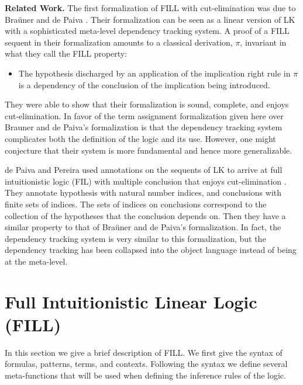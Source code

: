 \textbf{Related Work.} The first formalization of FILL with
cut-elimination was due to Bra\"uner and de Paiva \cite{Brauner:1998}.
Their formalization can be seen as a linear version of LK with a
sophisticated meta-level dependency tracking system.  A proof of a
FILL sequent in their formalization amounts to a classical derivation,
$\pi$, invariant in what they call the FILL property:
\begin{center}
  \begin{itemize}
  \item The hypothesis discharged by an application of the implication
    right rule in $\pi$ is a dependency of the conclusion of the
    implication being introduced.
  \end{itemize}
\end{center}
They were able to show that their formalization is sound, complete,
and enjoys cut-elimination.  In favor of the term assignment
formalization given here over Brauner and de Paiva's formalization is
that the dependency tracking system complicates both the definition of
the logic and its use.  However, one might conjecture that their
system is more fundamental and hence more generalizable.

de Paiva and Pereira used annotations on the sequents of LK to arrive
at full intuitionistic logic (FIL) with multiple conclusion that
enjoys cut-elimination \cite{dePaiva:2005}. They annotate hypothesis
with natural number indices, and conclusions with finite sets of
indices.  The sets of indices on conclusions correspond to the
collection of the hypotheses that the conclusion depends on.  Then
they have a similar property to that of Bra\"uner and de Paiva's
formalization.  In fact, the dependency tracking system is very
similar to this formalization, but the dependency tracking has been
collapsed into the object language instead of being at the meta-level.

\section{Full Intuitionistic Linear Logic (FILL)}
\label{sec:full_intuitionistic_linear_logic_(fill)}

In this section we give a brief description of FILL.  We first give
the syntax of formulas, patterns, terms, and contexts.  Following the
syntax we define several meta-functions that will be used when
defining the inference rules of the logic.

